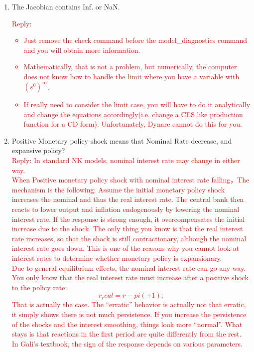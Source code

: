 \documentclass[10pt,math=newtx,citestyle=gb7714-2015,bibstyle=gb7714-2015]{elegantbook}
\begin{document}
{{{	\begin{enumerate}
		\item The Jacobian contains Inf. or NaN.\\
		\textcolor{red}{Reply:
			\begin{itemize}
				\item Just remove the check command before the model\_diagnostics command and you will obtain more information.
				\item Mathematically, that is not a problem, but numerically, the computer does not know how to handle the limit where you have a variable with $(s^0)^{\infty}$.
				\item If really need to consider the limit case, you will have to do it analytically and change the equations accordingly(i.e. change a CES like production function for a CD form). Unfortunately, Dynare cannot do this for you.
			\end{itemize}
		}
		\item Positive Monetary policy shock means that Nominal Rate decrease, and expansive policy?\\
		\textcolor{red}{Reply: In standard NK models, nominal interest rate may change in either way.\\
			When Positive monetary policy shock with nominal interest rate falling，The mechanism is the following: Assume the initial monetary policy shock increases the nominal and thus the real interest rate. The central bank then reacts to lower output and inflation endogenously by lowering the nominal interest rate. If the response is strong enough, it overcompensates the initial increase due to the shock. The only thing you know is that the real interest rate increases, so that the shock is still contractionary, although the nominal interest rate goes down. This is one of the reasons why you cannot look at interest rates to determine whether monetary policy is expansionary.\\
			Due to general equilibrium effects, the nominal interest rate can go any way. You only know that the real interest rate must increase after a positive shock to the policy rate:
			$$r_real=r-pi(+1);$$
			That is actually the case. The “erratic” behavior is actually not that erratic, it simply shows there is not much persistence. If you increase the persistence of the shocks and the interest smoothing, things look more “normal”. What stays is that reactions in the first period are quite differently from the rest.\\
			In Gali’s textbook, the sign of the response depends on various parameters.}

\end{enumerate}}}}
\end{document}
